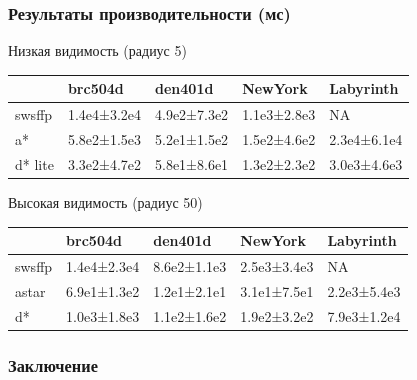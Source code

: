 \documentclass{beamer}
\begin{document}
    \begin{frame}
        \frametitle{Результаты производительности (мс)}
        Низкая видимость (радиус 5)

        \begin{tabular}{lllll}
            \hline
            & brc504d     & den401d     & NewYork     & Labyrinth   \\
            \hline
            swsffp  & 1.4e4±3.2e4 & 4.9e2±7.3e2 & 1.1e3±2.8e3 & NA          \\
            a*      & 5.8e2±1.5e3 & 5.2e1±1.5e2 & 1.5e2±4.6e2 & 2.3e4±6.1e4 \\
            d* lite & 3.3e2±4.7e2 & 5.8e1±8.6e1 & 1.3e2±2.3e2 & 3.0e3±4.6e3 \\
            \hline
        \end{tabular}

        \bigskip
        Высокая видимость (радиус 50)

        \begin{tabular}{lllll}
            \hline
            & brc504d     & den401d     & NewYork     & Labyrinth   \\
            \hline
            swsffp & 1.4e4±2.3e4 & 8.6e2±1.1e3 & 2.5e3±3.4e3 & NA          \\
            astar  & 6.9e1±1.3e2 & 1.2e1±2.1e1 & 3.1e1±7.5e1 & 2.2e3±5.4e3 \\
            d*     & 1.0e3±1.8e3 & 1.1e2±1.6e2 & 1.9e2±3.2e2 & 7.9e3±1.2e4 \\
            \hline
        \end{tabular}

    \end{frame}

    \newcommand{\dstarlite}{\(D^*\ lite\)\,}
    \begin{frame}
        \frametitle{Заключение}
    \end{frame}
\end{document}
